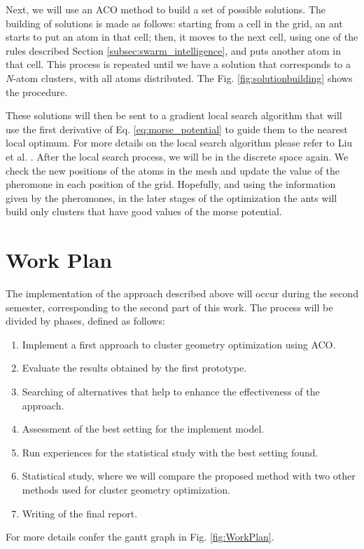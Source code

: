 	
	 Next, we will use an ACO method to build a set of possible solutions. The building of solutions is made as follows: starting from a cell in the grid, an ant starts to put an atom in that cell; then, it moves to the next cell, using one of the rules described Section \ref{subsec:swarm_intelligence}, and puts another atom in that cell. This process is repeated until we have a solution that corresponds to a \emph{N}-atom clusters, with all atoms distributed. The Fig. \ref{fig:solutionbuilding} shows the procedure.
	
	 These solutions will then be sent to a gradient local search algorithm that will use the first derivative of Eq. \ref{eq:morse_potential} to guide them to the nearest local optimum. For more details on the local search algorithm please refer to Liu et al. \cite{liu89}. After the local search process, we will be in the discrete space again. We check the new positions of the atoms in the mesh and update the value of the pheromone in each position of the grid. Hopefully, and using the information given by the pheromones, in the later stages of the optimization the ants will build only clusters that have good values of the morse potential.
	
\section{Work Plan}
The implementation of the approach described above will occur during the second semester, corresponding to the second part of this work. The process will be divided by phases, defined as follows:
	\begin{enumerate}
		\item Implement a first approach to cluster geometry optimization using ACO.
		\item Evaluate the results obtained by the first prototype.
		\item Searching of alternatives that help to enhance the effectiveness of the approach.
		\item Assessment of the best setting for the implement model.
		\item Run experiences for the statistical study with the best setting found.
		\item Statistical study, where we will compare the proposed method with two other methods used for cluster geometry optimization.
		\item Writing of the final report.
	\end{enumerate}
	
	For more details confer the gantt graph in Fig. \ref{fig:WorkPlan}.
	
	
	
	
	


